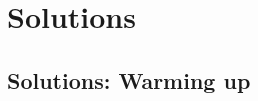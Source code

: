 \documentclass{easyclass}
\begin{document}

% 


% 


% 


\part{Solutions}

\chapter{Solutions: Warming up}


\end{document}
